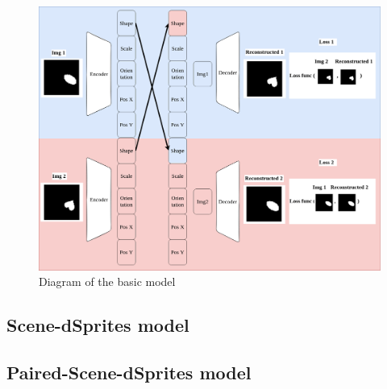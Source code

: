 \documentclass{article}
\begin{document}
    \begin{figure}[ht]
        \centering
        \includegraphics[width=\linewidth]{img/model/paired_dsprites_model}
        \caption{Diagram of the basic model}
        \label{fig:paired_dsprites_model}

    \end{figure}

    \subsection{Scene-dSprites model}

    \subsection{Paired-Scene-dSprites model}
\end{document}
